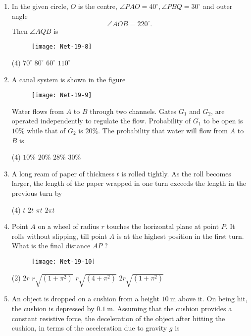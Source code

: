 \begin{enumerate}
\item  In the given circle, $O$ is the centre, $\angle P A O=40^{\circ}, \angle P B Q=30^{\circ}$ and outer angle
$$
\angle A O B=220^{\circ} \text {. }
$$
Then $\angle A Q B$ is
\begin{figure}[H]
	\centering
	\texttt{[image: Net-19-8]}
\end{figure}
 \begin{tasks}(4)
	\task[\textbf{a.}] $70^{\circ}$
	\task[\textbf{b.}] $80^{\circ}$
	\task[\textbf{c.}]$60^{\circ}$
	\task[\textbf{d.}] $110^{\circ}$
\end{tasks}
\item  A canal system is shown in the figure
\begin{figure}[H]
	\centering
	\texttt{[image: Net-19-9]}
\end{figure}
Water flows from $A$ to $B$ through two channels. Gates $G_{1}$ and $G_{2}$, are operated independently to regulate the flow. Probability of $G_{1}$ to be open is $10 \%$ while that of $G_{2}$ is $20 \%$. The probability that water will flow from $A$ to $B$ is
 \begin{tasks}(4)
	\task[\textbf{a.}]$10 \%$
	\task[\textbf{b.}]$20 \%$
	\task[\textbf{c.}]$28 \%$
	\task[\textbf{d.}]$30 \%$
\end{tasks}
\item  A long ream of paper of thickness $t$ is rolled tightly. As the roll becomes larger, the length of the paper wrapped in one turn exceeds the length in the previous turn by
 \begin{tasks}(4)
	\task[\textbf{a.}]$t$
	\task[\textbf{b.}]$2 t$
	\task[\textbf{c.}]$\pi t$
	\task[\textbf{d.}] $2 \pi t$
\end{tasks}
 \item   Point $A$ on a wheel of radius $r$ touches the horizontal plane at point $P$. It rolls without slipping, till point $A$ is at the highest position in the first turn. What is the final distance $A P$ ?
 \begin{figure}[H]
 	\centering
 	\texttt{[image: Net-19-10]}
 \end{figure}
 \begin{tasks}(2)
	\task[\textbf{a.}]$2 r$
	\task[\textbf{b.}]$r \sqrt{\left(1+\pi^{2}\right)}$
	\task[\textbf{c.}] $r \sqrt{\left(4+\pi^{2}\right)}$
	\task[\textbf{d.}] $2 r \sqrt{\left(1+\pi^{2}\right)}$
\end{tasks}
\item  An object is dropped on a cushion from a height $10 \mathrm{~m}$ above it. On being hit, the cushion is depressed by $0.1 \mathrm{~m}$. Assuming that the cushion provides a constant resistive force, the deceleration of the object after hitting the cushion, in terms of the acceleration due to gravity $g$ is

\end{enumerate}
